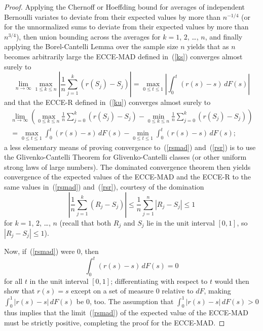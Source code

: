\documentclass{article}
\begin{document}
\begin{proof}
Applying the Chernoff or Hoeffding bound
for averages of independent Bernoulli variates
to deviate from their expected values by more than $n^{-1/4}$
(or for the unnormalized sums to deviate from their expected values
by more than $n^{3/4}$),
then union bounding across the averages for $k = 1$, $2$, \dots, $n$,
and finally applying the Borel-Cantelli Lemma over the sample size $n$
yields that as $n$ becomes arbitrarily large the ECCE-MAD defined in~(\ref{ks})
converges almost surely to
%
\begin{equation}
\label{rsmad}
\lim_{n \to \infty} \max_{1 \le k \le n}
\left| \frac{1}{n} \sum_{j=1}^k \left( r(S_j) - S_j \right) \right|
= \max_{0 \le t \le 1} \left| \int_0^t (r(s) - s) \, dF(s) \right|
\end{equation}
%
and that the ECCE-R defined in~(\ref{ku}) converges almost surely to
%
\begin{multline}
\label{rsr}
\lim_{n \to \infty} \left(
\max_{0 \le k \le n} \frac{1}{n} \sum_{j=0}^k \left( r(S_j) - S_j \right)
- \min_{0 \le k \le n} \frac{1}{n} \sum_{j=0}^k \left( r(S_j) - S_j \right)
\right) \\
= \max_{0 \le t \le 1} \int_0^t (r(s) - s) \, dF(s)
- \min_{0 \le t \le 1} \int_0^t (r(s) - s) \, dF(s);
\end{multline}
%
a less elementary means of proving convergence to~(\ref{rsmad}) and~(\ref{rsr})
is to use the Glivenko-Cantelli Theorem for Glivenko-Cantelli classes
(or other uniform strong laws of large numbers).
The dominated convergence theorem then yields convergence
of the expected values of the ECCE-MAD and the ECCE-R to the same values
in~(\ref{rsmad}) and~(\ref{rsr}), courtesy of the domination
%
\begin{equation}
\left| \frac{1}{n} \sum_{j=1}^k \left( R_j - S_j \right) \right|
\le \frac{1}{n} \sum_{j=1}^n \left| R_j - S_j \right| \le 1
\end{equation}
%
for $k = 1$, $2$, \dots, $n$ (recall that both $R_j$ and $S_j$ lie
in the unit interval $[0, 1]$, so $\left| R_j - S_j \right| \le 1$).

Now, if~(\ref{rsmad}) were 0, then
%
\begin{equation}
\int_0^t (r(s) - s) \, dF(s) = 0
\end{equation}
%
for all $t$ in the unit interval $[0, 1]$; differentiating with respect to $t$
would then show that $r(s) = s$ except on a set of measure 0 relative to $dF$,
making $\int_0^1 |r(s) - s| \, dF(s)$ be 0, too.
The assumption that $\int_0^1 |r(s) - s| \, dF(s) > 0$ thus implies that
the limit~(\ref{rsmad}) of the expected value of the ECCE-MAD
must be strictly positive, completing the proof for the ECCE-MAD.


\end{proof}
\end{document}

